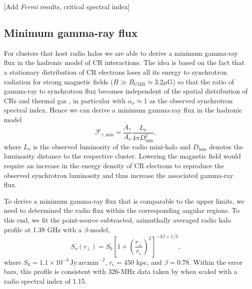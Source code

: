 \documentclass[12pt,manuscript]{aastex}
\def\del#1{{}}
\newcommand{\rmn}{\mathrm}
\newcommand{\CR}{\mathrm{CR}}
\newcommand{\dps}{\displaystyle}
\begin{document}
[Add {\em Fermi} results, critical spectral index]

%
%

\subsection{Minimum gamma-ray flux}
For clusters that host radio halos we are able to derive a minimum gamma-ray flux in the hadronic model of CR interactions. The idea is based on the fact that a stationary distribution of CR electrons loses all its energy to synchrotron radiation for strong magnetic fields ($B \gg B_{\rmn{CMB}} \simeq 3.2 \mu$G) so that the ratio of gamma-ray to synchrotron flux becomes independent of the spatial distribution of CRs and thermal gas \citep{article:Voelk:1989, article:Pohl:1994}, in particular with $\alpha_{\nu}\simeq 1$ as the observed synchrotron spectral index.  Hence we can derive a minimum gamma-ray flux in the hadronic
model
\begin{equation}
\label{eq:Fmin}
\mathcal{F}_{\gamma,\rmn{min}} = \frac{\dps A_{\gamma}}{\dps A_{\nu}}\frac{\dps L_{\nu}}{\dps 4\pi D_{\rmn{lum}}^{2}},
\end{equation}
where $L_{\nu}$ is the observed luminosity of the radio mini-halo and $D_{\rmn{lum}}$ denotes the luminosity distance to the respective cluster. Lowering the magnetic field would require an increase in the energy density of CR electrons to reproduce the observed synchrotron luminosity and thus increase the associated gamma-ray flux. 

To derive a minimum gamma-ray flux that is comparable to the upper limits, we need to determined the radio flux within the corresponding angular regions. To this end, we fit the point-source subtracted, azimuthally averaged radio halo profile at 1.38 GHz \citep{article:Deiss_etal:1997} with a $\beta$-model,
\begin{equation}
\label{beta}
 S_{\nu} (r_{\bot})= S_{0} \left[ 1 + \left( \frac{r_{\bot}}{r_{\rmn{c}}}\right)^{2}\right]^{-3\beta + 1/2},
\end{equation}
where $S_{0} = 1.1 \times 10^{-3}\,\rmn{Jy\,arcmin}^{-2}$, $r_{\rmn{c}} = 450$ kpc, and $\beta = 0.78$.  Within the error bars, this profile is consistent with 326-MHz data taken by \citet{article:Govoni_etal:2001} when scaled with a radio spectral index of 1.15. 
\end{document}
